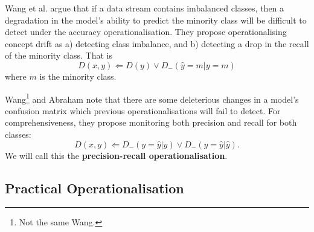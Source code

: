 Wang et al. argue that if a data stream contains imbalanced classes, then a degradation in the model's ability to predict the minority class will be difficult to detect under the accuracy operationalisation. They propose operationalising concept drift as a) detecting class imbalance, and b) detecting a drop in the recall of the minority class. That is
\begin{equation}
  D(x,y) \Leftarrow D(y) \vee D_-(\hat{y}=m|y=m)
\end{equation}
where $m$ is the minority class.

Wang\footnote{Not the same Wang.} and Abraham note that there are some deleterious changes in a model's confusion matrix which previous operationalisations will fail to detect. For comprehensiveness, they propose monitoring both precision and recall for both classes:
\begin{equation}
  D(x,y) \Leftarrow D_-(y=\hat{y}|y) \vee D_-(y=\hat{y}|\hat{y}).
\end{equation}
We will call this the {\bf precision-recall operationalisation}.

\subsection{Practical Operationalisation}

